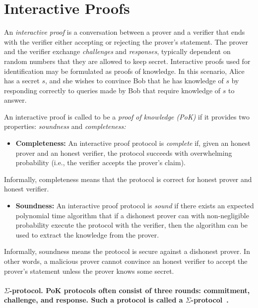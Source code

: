\documentclass[10pt]{article}
\theoremstyle{plain}
\begin{document}
\section{Interactive Proofs }

An \emph{interactive proof} is a conversation between a prover and
a verifier that ends with the verifier either accepting or rejecting
the prover's statement. The prover and the verifier exchange \emph{challenges}
and \emph{responses}, typically dependent on random numbers that they
are allowed to keep secret. Interactive proofs used for identification
may be formulated as proofs of knowledge. In this scenario, Alice
has a secret $s$, and she wishes to convince Bob that he has knowledge
of $s$ by responding correctly to queries made by Bob that require
knowledge of $s$ to answer.

An interactive proof is called to be a \emph{proof of knowledge (PoK)
}if it provides two properties: \emph{soundness} and \emph{completeness:}
\begin{itemize}
	\item \textbf{Completeness:} An interactive proof protocol is \emph{complete}
	if, given an honest prover and an honest verifier, the protocol succeeds
	with overwhelming probability (i.e., the verifier accepts the prover\textquoteright s
	claim).
\end{itemize}
Informally, completeness means that the protocol is correct for honest
prover and honest verifier.
\begin{itemize}
	\item \textbf{Soundness: }An interactive proof protocol is \emph{sound}
	if there exists an expected polynomial time algorithm that if a dishonest
	prover can with non-negligible probability execute the protocol with
	the verifier, then the algorithm can be used to extract the knowledge
	from the prover.
\end{itemize}
Informally, soundness means the protocol is secure against a dishonest
prover. In other words, a malicious prover cannot convince an honest
verifier to accept the prover's statement unless the prover knows
some secret.

\paragraph{$\Sigma$-protocol. \textmd{PoK protocols often consist of three
		rounds: commitment, challenge, and response. Such a protocol is called
		a $\Sigma$-protocol}~\cite{sigma:protocols:damgard}.}
\end{document}
